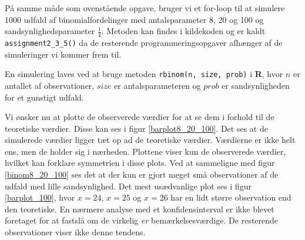 {

På samme måde som ovenstående opgave, bruger vi et for-loop til at
simulere 1000 udfald af binomialfordelinger med antalsparameter 8, 20 og
100 og sandsynlighedsparameter $\frac{1}{4}$. Metoden kan findes i
kildekoden og er kaldt \texttt{assignment2\_3\_5()} da de resterende
programmeringsopgaver afhænger af de simuleringer vi kommer frem til.

En simulering laves ved at bruge metoden \texttt{rbinom(n, size, prob)} i
\textbf{R}, hvor $n$ er antallet af observationer, $size$ er
antalsparameteren og $prob$ er sandsynligheden for et gunstigt udfald.

Vi ønsker nu at plotte de observerede værdier for at se dem i forhold til
de teoretiske værdier. Disse kan ses i figur \ref{barplot8_20_100}.
Det ses at de simulerede værdier ligger tæt op ad de teoretiske værdier.
Værdierne er ikke helt ens, men de holder sig i nærheden. Plottene viser
kun de observerede værdier, hvilket kan forklare symmetrien i disse
plots. Ved at sammeligne med figur \ref{binom8_20_100} ses det at der kun
er gjort meget små observationer af de udfald med lille sandsynlighed.
Det mest usædvanlige plot ses i figur \ref{barplot_100}, hvor $x = 24$,
$x = 25$ og $x = 26$ har en lidt større observation end den teoretiske.
En nærmere analyse med et konfidensinterval er ikke blevet foretaget for
at fastslå om de virkelig \emph{er} bemærkelsesværdige. De resterende
observationer viser ikke denne tendens.

}
